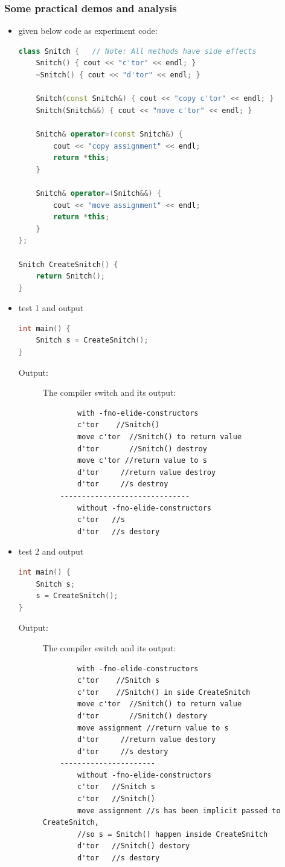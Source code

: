 \documentclass[a4paper,11pt,twoside]{book}
\begin{document}
\subsubsection{Some practical demos and analysis}
\begin{itemize}
	
	\item given below code as experiment code:
\begin{lstlisting}[frame=single, language=c++]
class Snitch {   // Note: All methods have side effects
	Snitch() { cout << "c'tor" << endl; }
	~Snitch() { cout << "d'tor" << endl; }
	
	Snitch(const Snitch&) { cout << "copy c'tor" << endl; }
	Snitch(Snitch&&) { cout << "move c'tor" << endl; }
	
	Snitch& operator=(const Snitch&) {
		cout << "copy assignment" << endl;
		return *this;
	}
	
	Snitch& operator=(Snitch&&) {
		cout << "move assignment" << endl;
		return *this;
	}
};
	
Snitch CreateSnitch() {
	return Snitch();
}
	\end{lstlisting}
	
	\item test 1 and output 
\begin{lstlisting}[frame=single, language=c++]
int main() {
	Snitch s = CreateSnitch();
}
\end{lstlisting}
\begin{description}
	\item[Output:] The compiler switch and its output:
	\begin{verbatim}
		with -fno-elide-constructors
		c'tor    //Snitch()
		move c'tor  //Snitch() to return value
		d'tor       //Snitch() destroy
		move c'tor //return value to s
		d'tor     //return value destroy
		d'tor     //s destroy
	------------------------------
		without -fno-elide-constructors
		c'tor   //s
		d'tor   //s destory
	\end{verbatim}
\end{description}
	
	\item test 2 and output
	\begin{lstlisting}[frame=single, language=c++]
int main() {
	Snitch s;
	s = CreateSnitch();
}
	\end{lstlisting}
\begin{description}
	\item[Output:] The compiler switch and its output:
	\begin{verbatim}
		with -fno-elide-constructors
		c'tor    //Snitch s
		c'tor    //Snitch() in side CreateSnitch
		move c'tor  //Snitch() to return value
		d'tor       //Snitch() destory
		move assignment //return value to s
		d'tor     //return value destory
		d'tor     //s destory
	----------------------	
		without -fno-elide-constructors
		c'tor   //Snitch s
		c'tor   //Snitch()
		move assignment //s has been implicit passed to CreateSnitch, 
		//so s = Snitch() happen inside CreateSnitch
		d'tor   //Snitch() destory
		d'tor   //s destory
	\end{verbatim}
\end{description}


\end{itemize}
\end{document}
